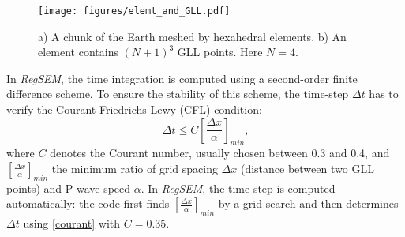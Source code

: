 \begin{figure}
\centerline{\texttt{[image: figures/elemt\_and\_GLL.pdf]}}
\caption{a) A chunk of the Earth meshed by hexahedral elements. b) An element contains $(N+1)^3$ GLL points. Here $N=4$.}
\label{elemt_and_GLL}
\end{figure}

In \textit{RegSEM}, the time integration is computed using a second-order finite difference scheme. To ensure the stability of this scheme, the time-step $\Delta t$ has to verify the Courant-Friedrichs-Lewy (CFL) condition:
\begin{equation}
\label{courant}
\Delta t \leq C \left[ \frac{\Delta x}{\alpha} \right]_{min} \mbox{,}
\end{equation}
where $C$ denotes the Courant number, usually chosen between 0.3 and 0.4, and $\left[ \frac{\Delta x}{\alpha} \right]_{min}$ the minimum ratio of grid spacing $\Delta x$ (distance between two GLL points) and P-wave speed $\alpha$. In \textit{RegSEM}, the time-step is computed automatically: the code first finds $\left[\frac{\Delta x}{\alpha} \right]_{min}$ by a grid search and then determines $\Delta t$ using \eqref{courant} with $C=0.35$.

